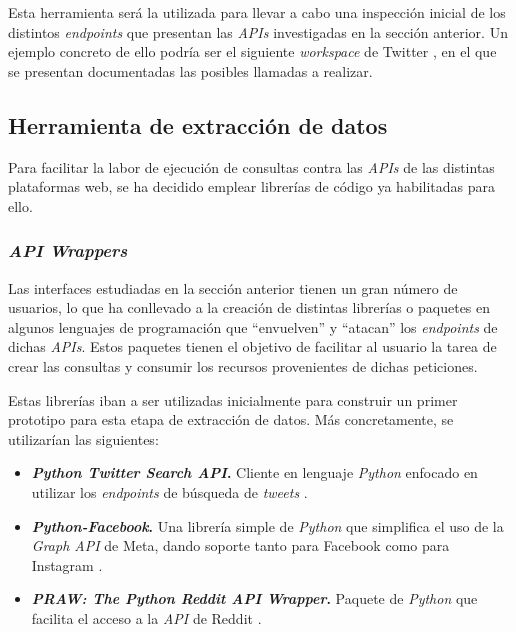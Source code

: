 Esta herramienta será la utilizada para llevar a cabo una inspección inicial de los distintos \textit{endpoints} que presentan las \textit{APIs} investigadas en la sección anterior. Un ejemplo concreto de ello podría ser el siguiente \textit{workspace} de Twitter \cite{postmanTwitterAPI}, en el que se presentan documentadas las posibles llamadas a realizar.

\subsection{Herramienta de extracción de datos}

Para facilitar la labor de ejecución de consultas contra las \textit{APIs} de las distintas plataformas web, se ha decidido emplear librerías de código ya habilitadas para ello.

\subsubsection{\textit{API Wrappers}} \label{section:api_wrappers}

Las interfaces estudiadas en la sección anterior tienen un gran número de usuarios, lo que ha conllevado a la creación de distintas librerías o paquetes en algunos lenguajes de programación que ``envuelven'' y ``atacan'' los \textit{endpoints} de dichas \textit{APIs}. Estos paquetes tienen el objetivo de facilitar al usuario la tarea de crear las consultas y consumir los recursos provenientes de dichas peticiones.

Estas librerías iban a ser utilizadas inicialmente para construir un primer prototipo para esta etapa de extracción de datos. Más concretamente, se utilizarían las siguientes:

\begin{itemize}
    \item \textbf{\textit{Python Twitter Search API}.} Cliente en lenguaje \textit{Python} enfocado en utilizar los \textit{endpoints} de búsqueda de \textit{tweets} \cite{twitterSearchAPI}.
    \item \textbf{\textit{Python-Facebook}.} Una librería simple de \textit{Python} que simplifica el uso de la \textit{Graph API} de Meta, dando soporte tanto para Facebook como para Instagram \cite{facebookAPIsearch}.
    \item \textbf{\textit{PRAW: The Python Reddit API Wrapper}.} Paquete de \textit{Python} que facilita el acceso a la \textit{API} de Reddit \cite{redditPRAW}.
\end{itemize}

